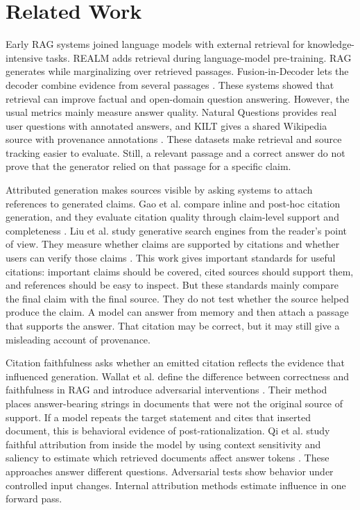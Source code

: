 \documentclass[11pt]{article}
\begin{document}
\section{Related Work}
\label{sec:related-work}

Early RAG systems joined language models with external retrieval for knowledge-intensive tasks. REALM adds retrieval during language-model pre-training. RAG generates while marginalizing over retrieved passages. Fusion-in-Decoder lets the decoder combine evidence from several passages \cite{guu2020realm,lewis2020rag,izacard2021fid}. These systems showed that retrieval can improve factual and open-domain question answering. However, the usual metrics mainly measure answer quality. Natural Questions provides real user questions with annotated answers, and KILT gives a shared Wikipedia source with provenance annotations \cite{kwiatkowski2019natural,petroni2021kilt}. These datasets make retrieval and source tracking easier to evaluate. Still, a relevant passage and a correct answer do not prove that the generator relied on that passage for a specific claim.

Attributed generation makes sources visible by asking systems to attach references to generated claims. Gao et al. compare inline and post-hoc citation generation, and they evaluate citation quality through claim-level support and completeness \cite{gao2023citations}. Liu et al. study generative search engines from the reader's point of view. They measure whether claims are supported by citations and whether users can verify those claims \cite{liu2023verifiability}. This work gives important standards for useful citations: important claims should be covered, cited sources should support them, and references should be easy to inspect. But these standards mainly compare the final claim with the final source. They do not test whether the source helped produce the claim. A model can answer from memory and then attach a passage that supports the answer. That citation may be correct, but it may still give a misleading account of provenance.

Citation faithfulness asks whether an emitted citation reflects the evidence that influenced generation. Wallat et al. define the difference between correctness and faithfulness in RAG and introduce adversarial interventions \cite{wallat2025correctness}. Their method places answer-bearing strings in documents that were not the original source of support. If a model repeats the target statement and cites that inserted document, this is behavioral evidence of post-rationalization. Qi et al. study faithful attribution from inside the model by using context sensitivity and saliency to estimate which retrieved documents affect answer tokens \cite{qi2024mirage}. These approaches answer different questions. Adversarial tests show behavior under controlled input changes. Internal attribution methods estimate influence in one forward pass.
\end{document}
